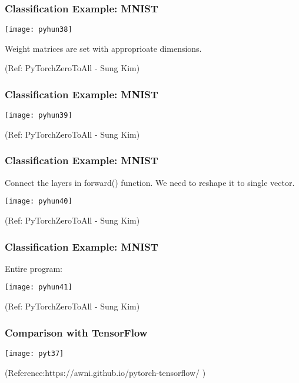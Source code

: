 \begin{frame}[fragile] \frametitle{Classification Example: MNIST}
\begin{center}
\texttt{[image: pyhun38]}
\end{center}

Weight matrices are set with approprioate dimensions.

\tiny{(Ref: PyTorchZeroToAll  - Sung Kim)}
\end{frame}

\begin{frame}[fragile] \frametitle{Classification Example: MNIST}
\begin{center}
\texttt{[image: pyhun39]}
\end{center}

\tiny{(Ref: PyTorchZeroToAll  - Sung Kim)}
\end{frame}

\begin{frame}[fragile] \frametitle{Classification Example: MNIST}

Connect the layers in forward() function. We need to reshape it to single vector.

\begin{center}
\texttt{[image: pyhun40]}
\end{center}

\tiny{(Ref: PyTorchZeroToAll  - Sung Kim)}
\end{frame}


\begin{frame}[fragile] \frametitle{Classification Example: MNIST}

Entire program:

\begin{center}
\texttt{[image: pyhun41]}
\end{center}


\tiny{(Ref: PyTorchZeroToAll  - Sung Kim)}
\end{frame}




\begin{frame}[fragile] \frametitle{Comparison with TensorFlow}
\begin{center}
\texttt{[image: pyt37]}
\end{center}
\tiny{(Reference:https://awni.github.io/pytorch-tensorflow/ )}
\end{frame}


